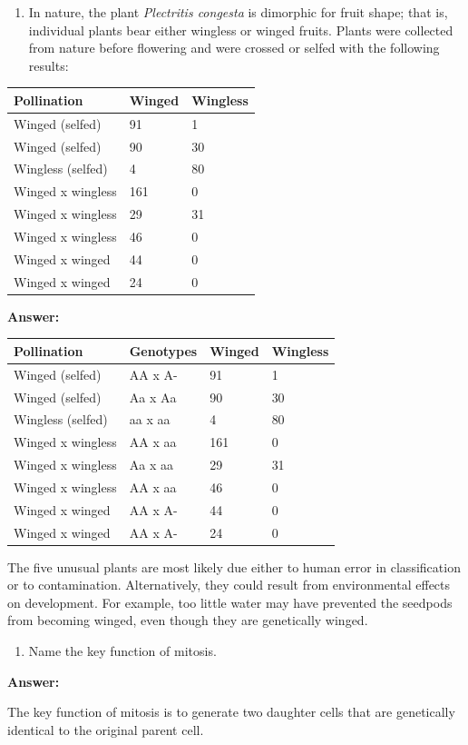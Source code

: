 \documentclass[11pt,]{article}
\providecommand{\tightlist}{%
  \setlength{\itemsep}{0pt}\setlength{\parskip}{0pt}}
\begin{document}
\begin{blackbox}

\begin{enumerate}
\def\labelenumi{\arabic{enumi}.}
\setcounter{enumi}{48}
\tightlist
\item
  In nature, the plant \emph{Plectritis congesta} is dimorphic for fruit
  shape; that is, individual plants bear either wingless or winged
  fruits. Plants were collected from nature before flowering and were
  crossed or selfed with the following results:
\end{enumerate}

\hfill\break

\begin{longtable}[]{@{}lll@{}}
\toprule
Pollination & Winged & Wingless\tabularnewline
\midrule
\endhead
Winged (selfed) & 91 & 1\tabularnewline
Winged (selfed) & 90 & 30\tabularnewline
Wingless (selfed) & 4 & 80\tabularnewline
Winged x wingless & 161 & 0\tabularnewline
Winged x wingless & 29 & 31\tabularnewline
Winged x wingless & 46 & 0\tabularnewline
Winged x winged & 44 & 0\tabularnewline
Winged x winged & 24 & 0\tabularnewline
\bottomrule
\end{longtable}

\textbf{Answer:}

\hfill\break

\begin{longtable}[]{@{}llll@{}}
\toprule
Pollination & Genotypes & Winged & Wingless\tabularnewline
\midrule
\endhead
Winged (selfed) & AA x A- & 91 & 1\tabularnewline
Winged (selfed) & Aa x Aa & 90 & 30\tabularnewline
Wingless (selfed) & aa x aa & 4 & 80\tabularnewline
Winged x wingless & AA x aa & 161 & 0\tabularnewline
Winged x wingless & Aa x aa & 29 & 31\tabularnewline
Winged x wingless & AA x aa & 46 & 0\tabularnewline
Winged x winged & AA x A- & 44 & 0\tabularnewline
Winged x winged & AA x A- & 24 & 0\tabularnewline
\bottomrule
\end{longtable}

The five unusual plants are most likely due either to human error in
classification or to contamination. Alternatively, they could result
from environmental effects on development. For example, too little water
may have prevented the seedpods from becoming winged, even though they
are genetically winged.

\end{blackbox}

\begin{blackbox}

\begin{enumerate}
\def\labelenumi{\arabic{enumi}.}
\setcounter{enumi}{17}
\tightlist
\item
  Name the key function of mitosis.
\end{enumerate}

\textbf{Answer:}

The key function of mitosis is to generate two daughter cells that are
genetically identical to the original parent cell.

\end{blackbox}
\end{document}
